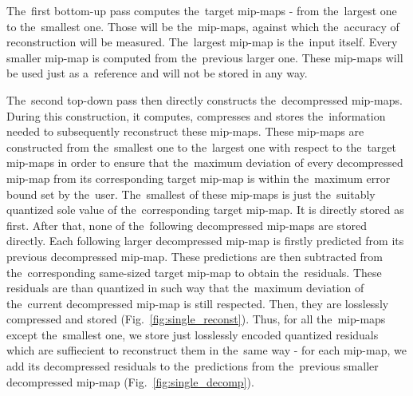 The~first bottom-up pass computes the~target mip-maps - from the~largest one to the~smallest one. Those will be the~mip-maps, against which the~accuracy of reconstruction will be measured. The~largest mip-map is the~input itself. Every smaller mip-map is computed from the~previous larger one. These mip-maps will be used just as a~reference and will not be stored in any way. 

The~second top-down pass then directly constructs the~decompressed mip-maps. During this construction, it computes, compresses and stores the~information needed to subsequently reconstruct these mip-maps. These mip-maps are constructed from the~smallest one to the~largest one with respect to the~target mip-maps in order to ensure that the~maximum deviation of every decompressed mip-map from its corresponding target mip-map is within the~maximum error bound set by the~user. The~smallest of these mip-maps is just the~suitably quantized sole value of the~corresponding target mip-map. It is directly stored as first. After that, none of the~following decompressed mip-maps are stored directly. Each following larger decompressed mip-map is firstly predicted from its previous decompressed mip-map. These predictions are then subtracted from the~corresponding same-sized target mip-map to obtain the~residuals. These residuals are than quantized in such way that the~maximum deviation of the~current decompressed mip-map is still respected. Then, they are losslessly compressed and stored (Fig.~\ref{fig:single_reconst}). Thus, for all the~mip-maps except the~smallest one, we store just losslessly encoded quantized residuals which are suffiecient to reconstruct them in the~same way - for each mip-map, we add its decompressed residuals to the~predictions from the~previous smaller decompressed mip-map (Fig.~\ref{fig:single_decomp}).

